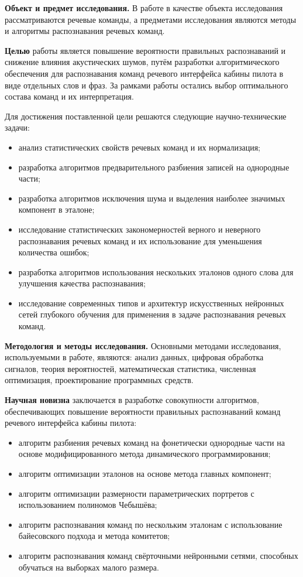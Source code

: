\textbf{Объект и предмет исследования.}
В работе в качестве объекта исследования рассматриваются речевые команды, а предметами исследования являются методы и алгоритмы распознавания речевых команд.

\textbf{Целью} работы является повышение вероятности правильных распознаваний и снижение влияния акустических шумов, путём разработки алгоритмического обеспечения для распознавания команд речевого интерфейса кабины пилота в виде отдельных слов и фраз.
За рамками работы остались выбор оптимального состава команд и их интерпретация.

Для достижения поставленной цели решаются следующие научно-технические задачи:
\begin{itemize}
	\item анализ статистических свойств речевых команд и их нормализация;
	\item разработка алгоритмов предварительного разбиения записей на однородные части;
	\item разработка алгоритмов исключения шума и выделения наиболее значимых компонент в эталоне;
	\item исследование статистических закономерностей верного и неверного распознавания речевых команд и их использование для уменьшения количества ошибок;
	\item разработка алгоритмов использования нескольких эталонов одного слова для улучшения качества распознавания;
	\item исследование современных типов и архитектур искусственных нейронных сетей глубокого обучения для применения в задаче распознавания речевых команд.
\end{itemize}

\textbf{Методология и методы исследования.}
Основными методами исследования, используемыми в работе, являются: анализ данных, цифровая обработка сигналов, теория вероятностей, математическая статистика, численная оптимизация, проектирование программных средств.

\textbf{Научная новизна} заключается в разработке совокупности алгоритмов, обеспечивающих повышение вероятности правильных распознаваний команд речевого интерфейса кабины пилота:
\begin{itemize}
	\item алгоритм разбиения речевых команд на фонетически однородные части на основе модифицированного метода динамического программирования;
	\item алгоритм оптимизации эталонов на основе метода главных компонент;
	\item алгоритм оптимизации размерности параметрических портретов с использованием полиномов Чебышёва;
	\item алгоритм распознавания команд по нескольким эталонам с использование байесовского подхода и метода комитетов;
	\item алгоритм распознавания команд свёрточными нейронными сетями, способных обучаться на выборках малого размера.
\end{itemize}

